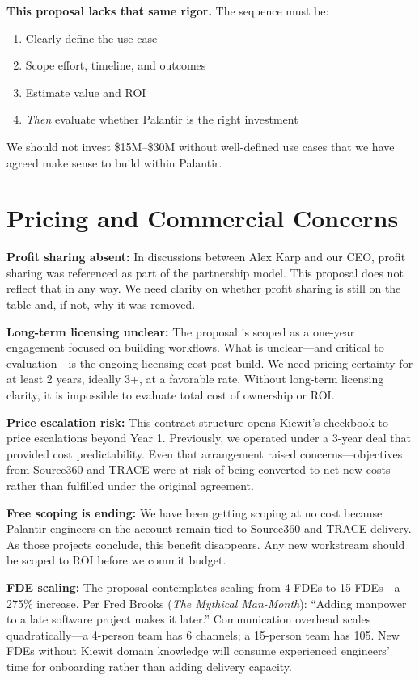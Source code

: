 \documentclass[11pt, letterpaper]{article}
\begin{document}
\textbf{This proposal lacks that same rigor.} The sequence must be:
\begin{enumerate}
    \item Clearly define the use case
    \item Scope effort, timeline, and outcomes
    \item Estimate value and ROI
    \item \textit{Then} evaluate whether Palantir is the right investment
\end{enumerate}

We should not invest \$15M--\$30M without well-defined use cases that we have agreed make sense to build within Palantir.

\vspace{1em}

\section*{Pricing and Commercial Concerns}

\textbf{Profit sharing absent:} In discussions between Alex Karp and our CEO, profit sharing was referenced as part of the partnership model. This proposal does not reflect that in any way. We need clarity on whether profit sharing is still on the table and, if not, why it was removed.

\textbf{Long-term licensing unclear:} The proposal is scoped as a one-year engagement focused on building workflows. What is unclear---and critical to evaluation---is the ongoing licensing cost post-build. We need pricing certainty for at least 2 years, ideally 3+, at a favorable rate. Without long-term licensing clarity, it is impossible to evaluate total cost of ownership or ROI.

\textbf{Price escalation risk:} This contract structure opens Kiewit's checkbook to price escalations beyond Year 1. Previously, we operated under a 3-year deal that provided cost predictability. Even that arrangement raised concerns---objectives from Source360 and TRACE were at risk of being converted to net new costs rather than fulfilled under the original agreement.

\textbf{Free scoping is ending:} We have been getting scoping at no cost because Palantir engineers on the account remain tied to Source360 and TRACE delivery. As those projects conclude, this benefit disappears. Any new workstream should be scoped to ROI before we commit budget.

\textbf{FDE scaling:} The proposal contemplates scaling from 4 FDEs to 15 FDEs---a 275\% increase. Per Fred Brooks (\textit{The Mythical Man-Month}): ``Adding manpower to a late software project makes it later.'' Communication overhead scales quadratically---a 4-person team has 6 channels; a 15-person team has 105. New FDEs without Kiewit domain knowledge will consume experienced engineers' time for onboarding rather than adding delivery capacity.
\end{document}
